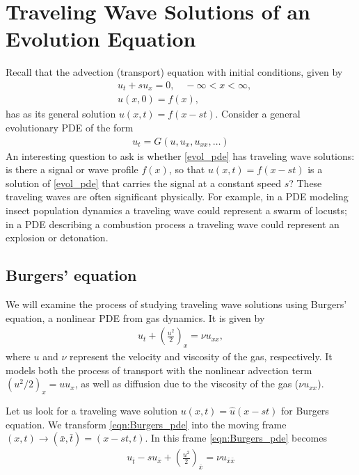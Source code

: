 \section*{Traveling Wave Solutions of an Evolution Equation}
Recall that the advection (transport) equation with initial conditions, given by
\begin{align*}
	&{ }u_t + su_x  = 0, \quad -\infty < x < \infty, \\
	&{ }u(x,0) = f(x),
\end{align*}
has as its general solution $u(x,t) = f(x -st)$.
Consider a general evolutionary PDE of the form
\begin{align}
u_t = G(u,u_x, u_{xx}, \ldots)
\label{evol_pde}
\end{align}
An interesting question to ask is whether \eqref{evol_pde} has traveling wave solutions: is there a signal or wave profile $f(x)$, so that $u(x,t) = f(x-st)$ is a solution of \eqref{evol_pde} that carries the signal at a constant speed $s$?
These traveling waves are often significant physically.
For example, in a PDE modeling insect population dynamics a traveling wave could represent a swarm of locusts; in a PDE describing a combustion process a traveling wave could represent an explosion or detonation.

\subsection*{Burgers' equation}
We will examine the process of studying traveling wave solutions using Burgers' equation, a nonlinear PDE from gas dynamics.
It is given by
\begin{align}
	u_t + \left( \frac{u^2}{2} \right)_x = \nu u_{xx}, \label{eqn:Burgers_pde}
\end{align}
where $u$ and $\nu$ represent the velocity and viscosity of the gas, respectively.
It models both the process of transport with the nonlinear advection term $(u^2/2)_x = u u_x$, as well as diffusion due to the viscosity of the gas ($\nu u_{xx}$).

Let us look for a traveling wave solution $u(x,t) = \hat{u}(x-st)$ for Burgers equation.
We transform \eqref{eqn:Burgers_pde} into the moving frame $(x,t) \to (\bar{x},\bar{t}) = (x-st, t)$. In this frame \eqref{eqn:Burgers_pde} becomes
\begin{align*}
	u_{\bar{t}} - s u_{\bar{x}}+ \left(\frac{u^2}{2} \right)_{\bar{x}} = \nu u_{\bar{x}\bar{x}}
\end{align*}

